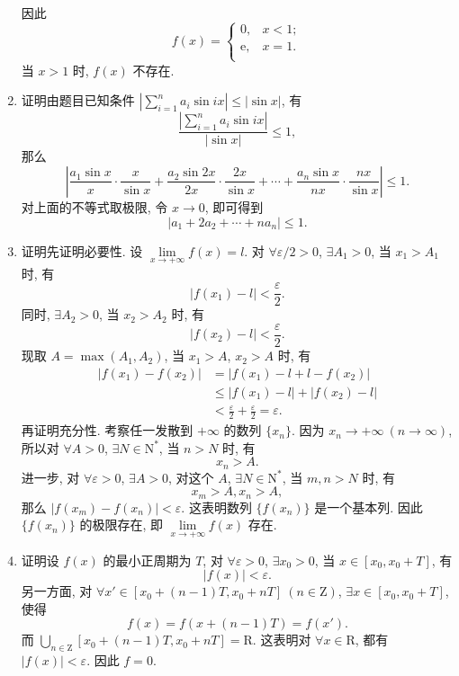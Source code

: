 \begin{enumerate}
\begin{align*}
        \end{align*}
        因此
        \[
            f(x) =
                \begin{cases}
                    0, & x < 1; \\
                    \mathrm{e}, & x = 1. \\
                \end{cases}
        \]
        当 $x > 1$ 时, $f(x)$ 不存在.
    \item %
        {\heiti 证明}\quad 由题目已知条件 $\left|\sum\limits_{i=1}^n a_i\sin ix\right| \leqslant |\sin x|$, 有
        \[
            \frac{\left|\sum\limits_{i=1}^n a_i\sin ix\right|}{|\sin x|} \leqslant 1,   
        \]
        那么
        \[
            \left| \frac{a_1\sin x}{x}\cdot\frac{x}{\sin x} + \frac{a_2\sin2x}{2x}\cdot\frac{2x}{\sin x} + \cdots + \frac{a_n\sin x}{nx}\cdot\frac{nx}{\sin x} \right| \leqslant 1.
        \]
        对上面的不等式取极限, 令 $x \to 0$, 即可得到
        \[
            |a_1 + 2a_2 + \cdots + na_n| \leqslant 1.
        \]
    \item %
        {\heiti 证明}\quad 先证明必要性. 设 $\lim\limits_{x\to+\infty}f(x) = l$. 对 $\forall \varepsilon/2 > 0$, $\exists A_1 > 0$, 当 $x_1 > A_1$ 时, 有
        \[
            |f(x_1) - l| < \frac\varepsilon2.    
        \]
        同时, $\exists A_2 > 0$, 当 $x_2 > A_2$ 时, 有
        \[
            |f(x_2) - l| < \frac\varepsilon2.    
        \]
        现取 $A = \max(A_1, A_2)$, 当 $x_1 > A$, $x_2 > A$ 时, 有
        \begin{align*}
            |f(x_1) - f(x_2)| &= |f(x_1) - l + l - f(x_2)| \\
                              &\leqslant |f(x_1) - l| + |f(x_2) - l| \\
                              &< \frac\varepsilon2 + \frac\varepsilon2 = \varepsilon.
        \end{align*}
        再证明充分性. 考察任一发散到 $+\infty$ 的数列 $\{x_n\}$. 因为 $x_n\rightarrow+\infty\ (n\to\infty)$, 所以对 $\forall A > 0$, $\exists N \in \mathrm{N}^*$, 当 $n > N$ 时, 有
        \[
            x_n > A.    
        \]
        进一步, 对 $\forall \varepsilon > 0$, $\exists A > 0$, 对这个 $A$, $\exists N \in \mathrm{N}^*$, 当 $m, n > N$ 时, 有
        \[
            x_m > A, x_n > A,    
        \]
        那么 $|f(x_m) - f(x_n)| < \varepsilon$. 这表明数列 $\{f(x_n)\}$ 是一个基本列. 因此 $\{f(x_n)\}$ 的极限存在, 即 $\lim\limits_{x\to+\infty}f(x)$ 存在.
    \item %
        {\heiti 证明}\quad 设 $f(x)$ 的最小正周期为 $T$, 对 $\forall \varepsilon > 0$, $\exists x_0 > 0$, 当 $x \in [x_0, x_0 + T]$, 有
        \[
            |f(x)| < \varepsilon.    
        \]
        另一方面, 对 $\forall x' \in [x_0 + (n-1)T, x_0 + nT]\ (n \in \mathrm{Z})$, $\exists x \in [x_0, x_0 + T]$, 使得
        \[
            f(x) = f(x + (n-1)T) = f(x').    
        \]
        而 $\bigcup\limits_{n\in\mathrm{Z}}[x_0 + (n-1)T, x_0 + nT] = \mathrm{R}$. 这表明对 $\forall x \in \mathrm{R}$, 都有 $|f(x)| < \varepsilon$. 因此 $f = 0$.
\end{enumerate}

% 